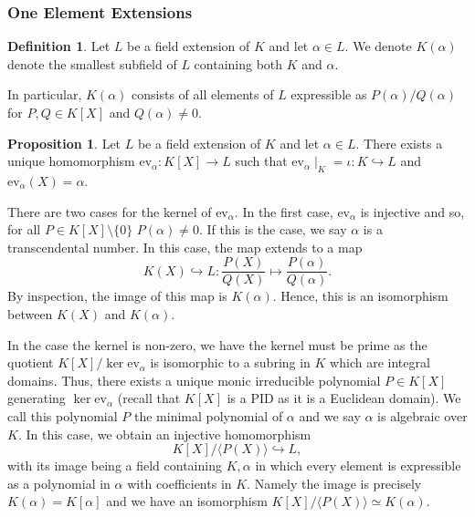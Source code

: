 \documentclass[]{article}
\theoremstyle{definition}
\theoremstyle{definition}
\newtheorem{definition}{Definition}[section]
\newtheorem{proposition}{Proposition}[section]
\begin{document}
\subsubsection{One Element Extensions}

\begin{definition}
  Let \(L\) be a field extension of \(K\) and let \(\alpha \in L\). We denote 
  \(K(\alpha)\) denote the smallest subfield of \(L\) containing both 
  \(K\) and \(\alpha\).  
\end{definition}

In particular, \(K(\alpha)\) consists of all elements of \(L\) expressible as 
\(P(\alpha) / Q(\alpha)\) for \(P, Q \in K[X]\) and \(Q(\alpha) \neq 0\).

\begin{proposition}
  Let \(L\) be a field extension of \(K\) and let \(\alpha \in L\). There 
  exists a unique homomorphism \(\text{ev}_\alpha : K[X] \to L\) such that 
  \(\text{ev}_\alpha \mid_K = \iota : K \hookrightarrow L\) and 
  \(\text{ev}_\alpha(X) = \alpha\).
\end{proposition}

There are two cases for the kernel of \(\text{ev}_\alpha\). In the first case, 
\(\text{ev}_\alpha\) is injective and so, for all \(P \in K[X] \setminus \{0\}\) 
\(P(\alpha) \neq 0\). If this is the case, we say \(\alpha\) is a transcendental 
number. In this case, the map extends to a map 
\[K(X) \hookrightarrow L : \frac{P(X)}{Q(X)} \mapsto \frac{P(\alpha)}{Q(\alpha)}.\]
By inspection, the image of this map is \(K(\alpha)\). Hence, this is an 
isomorphism between \(K(X)\) and \(K(\alpha)\).

In the case the kernel is non-zero, we have the kernel must be prime as the 
quotient \(K[X] / \ker \text{ev}_\alpha\) is isomorphic to a subring in \(K\) 
which are integral domains. Thus, there exists a unique monic irreducible polynomial 
\(P \in K[X]\) generating \(\ker \text{ev}_\alpha\) (recall that 
\(K[X]\) is a PID as it is a Euclidean domain). We call this polynomial 
\(P\) the minimal polynomial of \(\alpha\) and we say \(\alpha\) is 
algebraic over \(K\). In this case, we obtain an injective homomorphism 
\[K[X] / \langle P(X) \rangle \hookrightarrow L,\]
with its image being a field containing \(K, \alpha\) in which every element 
is expressible as a polynomial in \(\alpha\) with coefficients in \(K\). Namely 
the image is precisely \(K(\alpha) = K[\alpha]\) and we have an isomorphism 
\(K[X] / \langle P(X) \rangle \simeq K(\alpha)\).
\end{document}
